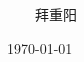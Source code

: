 
\begin{thanks}



\vskip 18pt

\begin{flushright}

~~~~拜重阳~~~~

\today

\end{flushright}

\end{thanks}
